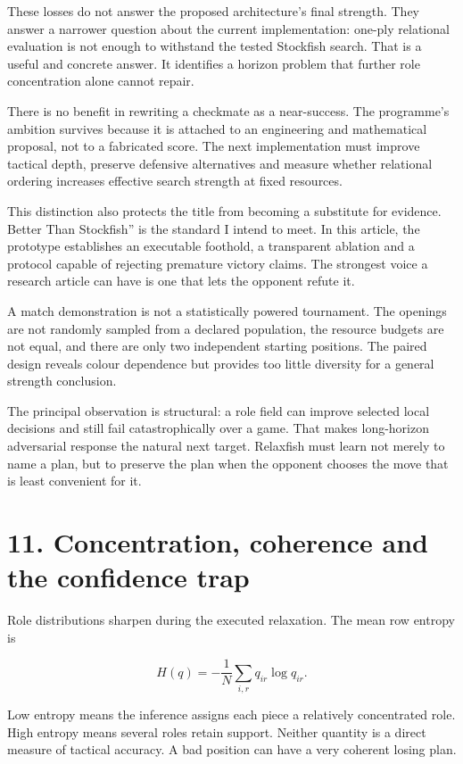 \documentclass[10pt]{article}
\begin{document}
These losses do not answer the proposed architecture's final strength. They answer a narrower question about the current implementation: one-ply relational evaluation is not enough to withstand the tested Stockfish search. That is a useful and concrete answer. It identifies a horizon problem that further role concentration alone cannot repair.

There is no benefit in rewriting a checkmate as a near-success. The programme's ambition survives because it is attached to an engineering and mathematical proposal, not to a fabricated score. The next implementation must improve tactical depth, preserve defensive alternatives and measure whether relational ordering increases effective search strength at fixed resources.

This distinction also protects the title from becoming a substitute for evidence. Better Than Stockfish'' is the standard I intend to meet. In this article, the prototype establishes an executable foothold, a transparent ablation and a protocol capable of rejecting premature victory claims. The strongest voice a research article can have is one that lets the opponent refute it.

A match demonstration is not a statistically powered tournament. The openings are not randomly sampled from a declared population, the resource budgets are not equal, and there are only two independent starting positions. The paired design reveals colour dependence but provides too little diversity for a general strength conclusion.

The principal observation is structural: a role field can improve selected local decisions and still fail catastrophically over a game. That makes long-horizon adversarial response the natural next target. Relaxfish must learn not merely to name a plan, but to preserve the plan when the opponent chooses the move that is least convenient for it.

\clearpage
\section*{11. Concentration, coherence and the confidence trap}
Role distributions sharpen during the executed relaxation. The mean row entropy is

\[
H(q)=-\frac1N\sum_{i,r}q_{ir}\log q_{ir}.
\]

Low entropy means the inference assigns each piece a relatively concentrated role. High entropy means several roles retain support. Neither quantity is a direct measure of tactical accuracy. A bad position can have a very coherent losing plan.
\end{document}
